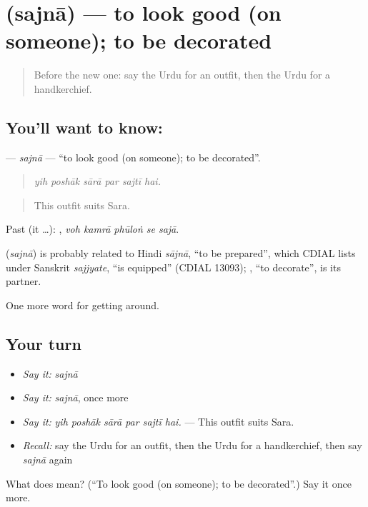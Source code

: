 \section[\texorpdfstring{\ur{سجنا} (sajnā)}{سجنا (sajnā)}]{ (sajnā) — to look good (on someone); to be decorated}

\label{lesson:UR-C427-sajna}



\begin{quote}
Before the new one: say the Urdu for an outfit, then the Urdu for a handkerchief.
\end{quote}

\subsection*{You'll want to know: }
\textbf{} — \emph{sajnā} — \textquotedblleft{}to look good (on someone); to be decorated\textquotedblright{}.

\begin{quote}
     
\end{quote}

\begin{quote}
\emph{yih poshāk sārā par sajtī hai.}
\end{quote}

\begin{quote}
This outfit suits Sara.
\end{quote}

Past (it …):     , \emph{voh kamrā phūloṅ se sajā}.

\begin{cousinweb}
\textbf{} (\emph{sajnā}) is probably related to Hindi \emph{sājnā}, \textquotedblleft{}to be prepared\textquotedblright{}, which CDIAL lists under Sanskrit \emph{sajjyate}, \textquotedblleft{}is equipped\textquotedblright{} (CDIAL 13093); \textbf{}, \textquotedblleft{}to decorate\textquotedblright{}, is its partner.
\end{cousinweb}

\begin{grammarlens}[title={What you've built}]
One more word for getting around.
\end{grammarlens}

\subsection*{Your turn}
\begin{itemize}
\raggedright
  \item \emph{Say it:} \emph{sajnā}
  \item \emph{Say it:} \emph{sajnā}, once more
  \item \emph{Say it:} \emph{yih poshāk sārā par sajtī hai.} — This outfit suits Sara.
  \item \emph{Recall:} say the Urdu for an outfit, then the Urdu for a handkerchief, then say \emph{sajnā} again
\end{itemize}

\begin{tcolorbox}[breakable,colback=teal!4,colframe=teal!35!black,title={Before you move on}]
What does  mean? (\textquotedblleft{}To look good (on someone); to be decorated\textquotedblright{}.) Say it once more.
\end{tcolorbox}
